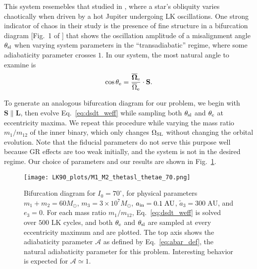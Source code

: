 \documentclass[
        twocolumn,
        twocolappendix
    ]{aastex63}
\newcommand*{\abs}[1]{\left|#1\right|}
\renewcommand*{\bm}[1]{\boldsymbol{\mathbf{#1}}}
\begin{document}
This system resemebles that studied in \citet{storch}, where a star's obliquity
varies chaotically when driven by a hot Jupiter undergoing LK oscillations. One
strong indicator of chaos in their study is the presence of fine structure in a
bifurcation diagram [Fig.~1 of \citet{storch}] that shows the oscillation
amplitude of a misalignment angle $\theta_{\rm sl}$ when varying system
parameters in the ``transadiabatic'' regime, where some adiabaticity parameter
crosses $1$. In our system, the most natural angle to examine is
\begin{equation}
    \cos \theta_{\rm e} = \frac{\bm{\overline{\Omega}}_{\rm
        e}}{\overline{\Omega}_{\rm e}}\cdot \bm{S}.\label{eq:q_eff_inst}
\end{equation}

To generate an analogous bifurcation diagram for our problem, we begin with
$\bm{S} \parallel \bm{L}$, then evolve Eq.~\eqref{eq:dsdt_weff} while sampling
both $\theta_{\rm sl}$ and $\theta_{\rm e}$ at eccentricity maxima. We repeat
this procedure while varying the mass ratio $m_1 / m_{12}$ of the inner binary,
which only changes $\Omega_{\rm SL}$ without changing the orbital evolution.
Note that the fiducial parameters do not serve this purpose well because GR
effects are too weak initially, and the system is not in the desired regime.
Our choice of parameters and our results are shown in
Fig.~\ref{fig:bifurcation_70}.
\begin{figure}
    \centering
    \texttt{[image: LK90\_plots/M1\_M2\_thetasl\_thetae\_70.png]}
    \caption{Bifurcation diagram for $I_0 = 70^\circ$, for physical parameters
    $m_1 + m_2 = 60M_{\odot}$, $m_3 = 3 \times 10^7 M_{\odot}$, $a_{\rm in} =
    0.1\;\mathrm{AU}$, $\tilde{a}_3 = 300\;\mathrm{AU}$, and $e_3 = 0$. For each
    mass ratio $m_1 / m_{12}$, Eq.~\eqref{eq:dsdt_weff} is solved over $500$ LK
    cycles, and both $\theta_{\rm e}$ and $\theta_{\rm sl}$ are sampled at every
    eccentricity maximum and are plotted. The top axis shows the adiabaticity
    parameter $\mathcal{A}$ as defined by Eq.~\eqref{eq:abar_def}, the natural
    adiabaticity parameter for this problem. Interesting behavior is expected
    for $\mathcal{A} \simeq 1$.}\label{fig:bifurcation_70}
\end{figure}
\end{document}
